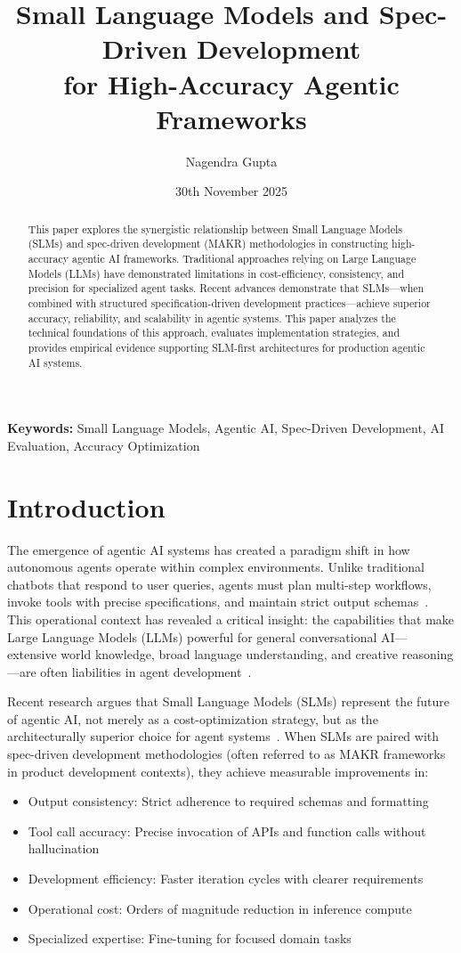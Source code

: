 \documentclass[11pt,a4paper]{article}
\title{Small Language Models and Spec-Driven Development\\for High-Accuracy Agentic Frameworks}
\author{Nagendra Gupta}
\date{30th November 2025}
\begin{document}
\maketitle

\begin{abstract}
This paper explores the synergistic relationship between Small Language Models (SLMs) and spec-driven development (MAKR) methodologies in constructing high-accuracy agentic AI frameworks. Traditional approaches relying on Large Language Models (LLMs) have demonstrated limitations in cost-efficiency, consistency, and precision for specialized agent tasks. Recent advances demonstrate that SLMs---when combined with structured specification-driven development practices---achieve superior accuracy, reliability, and scalability in agentic systems. This paper analyzes the technical foundations of this approach, evaluates implementation strategies, and provides empirical evidence supporting SLM-first architectures for production agentic AI systems.
\end{abstract}

\textbf{Keywords:} Small Language Models, Agentic AI, Spec-Driven Development, AI Evaluation, Accuracy Optimization

\section{Introduction}
The emergence of agentic AI systems has created a paradigm shift in how autonomous agents operate within complex environments. Unlike traditional chatbots that respond to user queries, agents must plan multi-step workflows, invoke tools with precise specifications, and maintain strict output schemas~\cite{belcak2025}. This operational context has revealed a critical insight: the capabilities that make Large Language Models (LLMs) powerful for general conversational AI---extensive world knowledge, broad language understanding, and creative reasoning---are often liabilities in agent development~\cite{nvidia2025}.

Recent research argues that Small Language Models (SLMs) represent the future of agentic AI, not merely as a cost-optimization strategy, but as the architecturally superior choice for agent systems~\cite{belcak2025}. When SLMs are paired with spec-driven development methodologies (often referred to as MAKR frameworks in product development contexts), they achieve measurable improvements in:

\begin{itemize}
    \item Output consistency: Strict adherence to required schemas and formatting
    \item Tool call accuracy: Precise invocation of APIs and function calls without hallucination
    \item Development efficiency: Faster iteration cycles with clearer requirements
    \item Operational cost: Orders of magnitude reduction in inference compute~\cite{belcak2025}
    \item Specialized expertise: Fine-tuning for focused domain tasks~\cite{thirdeye2025}
\end{itemize}
\end{document}
